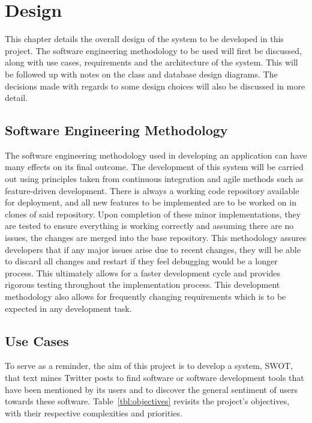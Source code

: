 \chapter{Design}
\label{cha:design}

This chapter details the overall design of the system to be developed in this project. The software engineering methodology to be used will first be discussed, along with use cases, requirements and the architecture of the system. This will be followed up with notes on the class and database design diagrams. The decisions made with regards to some design choices will also be discussed in more detail.

\section{Software Engineering Methodology}
The software engineering methodology used in developing an application can have many effects on its final outcome. The development of this system will be carried out using principles taken from continuous integration and agile methods such as feature-driven development. There is always a working code repository available for deployment, and all new features to be implemented are to be worked on in clones of said repository. Upon completion of these minor implementations, they are tested to ensure everything is working correctly and assuming there are no issues, the changes are merged into the base repository. This methodology assures developers that if any major issues arise due to recent changes, they will be able to discard all changes and restart if they feel debugging would be a longer process. This ultimately allows for a faster development cycle and provides rigorous testing throughout the implementation process. This development methodology also allows for frequently changing requirements which is to be expected in any development task.

\section{Use Cases}
\label{sec:uc}
To serve as a reminder, the aim of this project is to develop a system, SWOT, that text mines Twitter posts to find software or software development tools that have been mentioned by its users and to discover the general sentiment of users towards these software. Table~\ref{tbl:objectives} revisits the project's objectives, with their respective complexities and priorities.

